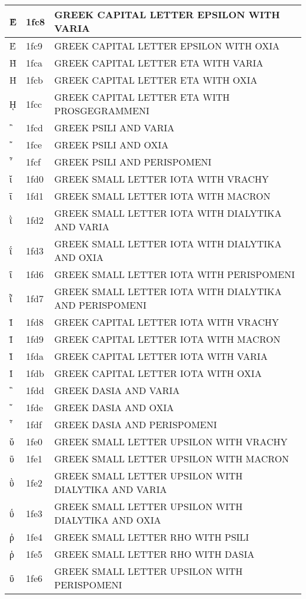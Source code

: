 \documentclass[12pt,letterpaper,openany]{book}
\begin{document}
\begin{center}
\begin{supertabular}{|m{0.25in}|m{0.5in}|m{4in}|}
Ὲ & 1fc8 & GREEK CAPITAL LETTER EPSILON WITH VARIA\\\hline
Έ & 1fc9 & GREEK CAPITAL LETTER EPSILON WITH OXIA\\\hline
Ὴ & 1fca & GREEK CAPITAL LETTER ETA WITH VARIA\\\hline
Ή & 1fcb & GREEK CAPITAL LETTER ETA WITH OXIA\\\hline
ῌ & 1fcc & GREEK CAPITAL LETTER ETA WITH PROSGEGRAMMENI\\\hline
῍ & 1fcd & GREEK PSILI AND VARIA\\\hline
῎ & 1fce & GREEK PSILI AND OXIA\\\hline
῏ & 1fcf & GREEK PSILI AND PERISPOMENI\\\hline
ῐ & 1fd0 & GREEK SMALL LETTER IOTA WITH VRACHY\\\hline
ῑ & 1fd1 & GREEK SMALL LETTER IOTA WITH MACRON\\\hline
ῒ & 1fd2 & GREEK SMALL LETTER IOTA WITH DIALYTIKA AND VARIA\\\hline
ΐ & 1fd3 & GREEK SMALL LETTER IOTA WITH DIALYTIKA AND OXIA\\\hline
ῖ & 1fd6 & GREEK SMALL LETTER IOTA WITH PERISPOMENI\\\hline
ῗ & 1fd7 & GREEK SMALL LETTER IOTA WITH DIALYTIKA AND PERISPOMENI\\\hline
Ῐ & 1fd8 & GREEK CAPITAL LETTER IOTA WITH VRACHY\\\hline
Ῑ & 1fd9 & GREEK CAPITAL LETTER IOTA WITH MACRON\\\hline
Ὶ & 1fda & GREEK CAPITAL LETTER IOTA WITH VARIA\\\hline
Ί & 1fdb & GREEK CAPITAL LETTER IOTA WITH OXIA\\\hline
῝ & 1fdd & GREEK DASIA AND VARIA\\\hline
῞ & 1fde & GREEK DASIA AND OXIA\\\hline
῟ & 1fdf & GREEK DASIA AND PERISPOMENI\\\hline
ῠ & 1fe0 & GREEK SMALL LETTER UPSILON WITH VRACHY\\\hline
ῡ & 1fe1 & GREEK SMALL LETTER UPSILON WITH MACRON\\\hline
ῢ & 1fe2 & GREEK SMALL LETTER UPSILON WITH DIALYTIKA AND VARIA\\\hline
ΰ & 1fe3 & GREEK SMALL LETTER UPSILON WITH DIALYTIKA AND OXIA\\\hline
ῤ & 1fe4 & GREEK SMALL LETTER RHO WITH PSILI\\\hline
ῥ & 1fe5 & GREEK SMALL LETTER RHO WITH DASIA\\\hline
ῦ & 1fe6 & GREEK SMALL LETTER UPSILON WITH PERISPOMENI\\\hline

\end{supertabular}
\end{center}
\end{document}
